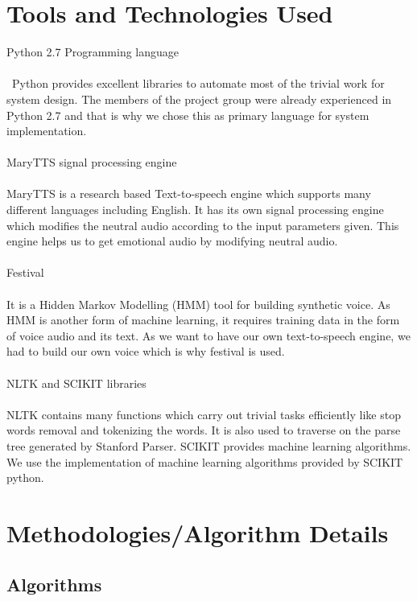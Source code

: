 \documentclass[oneside,a4paper,12pt]{book}
\begin{document}
  \section{Tools and Technologies Used}
   Python 2.7 Programming language\\\\\
   Python provides excellent libraries to automate most of the trivial work for system design. The members of the project group were already experienced in Python 2.7 and that is why we chose this as primary language for system implementation.\\\\
   MaryTTS signal processing engine\\\\
  	 MaryTTS is a research based Text-to-speech engine which supports many different languages including English. It has its own signal processing engine which modifies the neutral audio according to the input parameters given.
  	 This engine helps us to get emotional audio by modifying neutral audio.\\\\
  	 Festival\\\\
  	 It is a Hidden Markov Modelling (HMM) tool for building synthetic voice. As HMM is another form of machine learning, it requires training data in the form of voice audio and its text. As we want to have our own text-to-speech engine, we had to build our own voice which is why festival is used.\\\\
  	 NLTK and SCIKIT libraries\\\\
  	 NLTK contains many functions which carry out trivial tasks efficiently like stop words removal and tokenizing the words. It is also used to traverse on the parse tree generated by Stanford Parser. SCIKIT provides machine learning algorithms. We use the implementation of machine learning algorithms provided by SCIKIT python.
  	 
  \section{Methodologies/Algorithm Details}
  \subsection{Algorithms}
\end{document}
